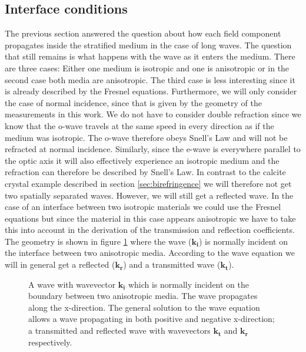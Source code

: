 \subsection{Interface conditions}
\label{sec:interface_conditions}
The previous section answered the question about how each field component propagates inside the stratified medium in the case of long waves. The question that still remains is what happens with the wave as it enters the medium. There are three cases: Either one medium is isotropic and one is anisotropic or in the second case both media are anisotropic. The third case is less interesting since it is already described by the Fresnel equations. Furthermore, we will only consider the case of normal incidence, since that is given by the geometry of the measurements in this work. We do not have to consider double refraction since we know that the o-wave travels at the same speed in every direction as if the medium was isotropic. The o-wave therefore obeys Snell's Law and will not be refracted at normal incidence. Similarly, since the e-wave is everywhere parallel to the optic axis it will also effectively experience an isotropic medium and the refraction can therefore be described by Snell's Law. In contrast to the calcite crystal example described in section \ref{sec:birefringence} we will therefore not get two spatially separated waves. However, we will still get a reflected wave. In the case of an interface between two isotropic materials we could use the Fresnel equations but since the material in this case appears anisotropic we have to take this into account in the derivation of the transmission and reflection coefficients. The geometry is shown in figure \ref{fig:interface_derivation} where the wave ($\bm{k_i}$) is normally incident on the interface between two anisotropic media. According to the wave equation we will in general get a reflected ($\bm{k_r}$) and a transmitted wave ($\bm{k_t}$). 

\begin{figure}[h]
    \centering
    
    \caption{A wave with wavevector $\bm{k_i}$ which is normally incident on the boundary between two anisotropic media. The wave propagates along the x-direction. The general solution to the wave equation allows a wave propagating in both positive and negative x-direction; a transmitted and reflected wave with wavevectors $\bm{k_t}$ and $\bm{k_r}$ respectively.}
    \label{fig:interface_derivation}
\end{figure}

